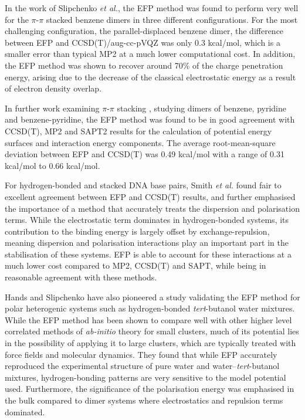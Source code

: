 In the work of Slipchenko \emph{et al.}, the EFP method was found to perform very well for the $\pi$-$\pi$ stacked benzene dimers in three different configurations.
For the most challenging configuration, the parallel-displaced benzene dimer, the difference between EFP and CCSD(T)/aug-cc-pVQZ was only 0.3 kcal/mol, which is a smaller error than typical MP2 at a much lower computational cost.
In addition, the EFP method was shown to recover around 70\% of the charge penetration energy, arising due to the decrease of the classical electrostatic energy as a result of electron density overlap.
\cite{Slipchenko2007a}


In further work examining $\pi$-$\pi$ stacking
\cite{Smith2008a}, 
studying dimers of benzene, pyridine and benzene-pyridine, the EFP method was found to be in good agreement with CCSD(T), MP2 and SAPT2 results for the calculation of potential energy surfaces and interaction energy components.
The average root-mean-square deviation between EFP and CCSD(T) was 0.49 kcal/mol with a range of 0.31 kcal/mol to 0.66 kcal/mol.
\cite{Smith2011a,Slipchenko2009a}


For hydrogen-bonded and stacked DNA base pairs, Smith \emph{et al.} found fair to excellent agreement between EFP and CCSD(T) results, and further emphasised the importance of a method that accurately treats the dispersion and polarisation terms.
While the electrostatic term dominates in hydrogen-bonded systems, its contribution to the binding energy is largely offset by exchange-repulsion, meaning dispersion and polarisation interactions play an important part in the stabilisation of these systems.
EFP is able to account for these interactions at a much lower cost compared to MP2, CCSD(T) and SAPT, while being in reasonable agreement with these methods.
\cite{Smith2011b}


Hands and Slipchenko have also pioneered a study validating the EFP method for polar heterogenic systems
\cite{Hands2012a}
such as hydrogen-bonded \emph{tert}-butanol water mixtures.
While the EFP method has been shown to compare well with other higher level correlated methods of \emph{ab-initio} theory for small clusters, much of its potential lies in the possibility of applying it to large clusters, which are typically treated with force fields and molecular dynamics.
They found that while EFP accurately reproduced the experimental structure of pure water and water--\emph{tert}-butanol mixtures, hydrogen-bonding patterns are very sensitive to the model potential used.
Furthermore, the significance of the polarisation energy was emphasised in the bulk compared to dimer systems where electrostatics and repulsion terms dominated.


